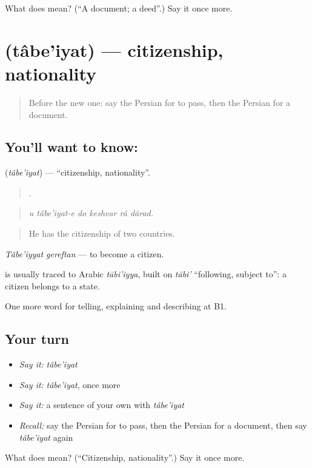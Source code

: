 \begin{tcolorbox}[breakable,colback=teal!4,colframe=teal!35!black,title={Before you move on}]
What does  mean? (\textquotedblleft{}A document; a deed\textquotedblright{}.) Say it once more.
\end{tcolorbox}
\section[\texorpdfstring{\fa{تابعیت} (tâbe'iyat)}{تابعیت (tâbe'iyat)}]{ (tâbe'iyat) — citizenship, nationality}

\label{lesson:FA-C410-tabeiyyat}



\begin{quote}
Before the new one: say the Persian for to pass, then the Persian for a document.
\end{quote}

\subsection*{You'll want to know: }
\textbf{} (\emph{tâbe'iyat}) — \textquotedblleft{}citizenship, nationality\textquotedblright{}.

\begin{quote}
     .
\end{quote}

\begin{quote}
\emph{u tâbe'iyat-e do keshvar râ dârad.}
\end{quote}

\begin{quote}
He has the citizenship of two countries.
\end{quote}

\emph{Tâbe'iyyat gereftan} — to become a citizen.

\begin{cousinweb}
\textbf{} is usually traced to Arabic \emph{tābi'iyya}, built on \emph{tābi'} \textquotedblleft{}following, subject to\textquotedblright{}: a citizen belongs to a state.
\end{cousinweb}

\begin{grammarlens}[title={What you've built}]
One more word for telling, explaining and describing at B1.
\end{grammarlens}

\subsection*{Your turn}
\begin{itemize}
\raggedright
  \item \emph{Say it:} \emph{tâbe'iyat}
  \item \emph{Say it:} \emph{tâbe'iyat}, once more
  \item \emph{Say it:} a sentence of your own with \emph{tâbe'iyat}
  \item \emph{Recall:} say the Persian for to pass, then the Persian for a document, then say \emph{tâbe'iyat} again
\end{itemize}

\begin{tcolorbox}[breakable,colback=teal!4,colframe=teal!35!black,title={Before you move on}]
What does  mean? (\textquotedblleft{}Citizenship, nationality\textquotedblright{}.) Say it once more.
\end{tcolorbox}
